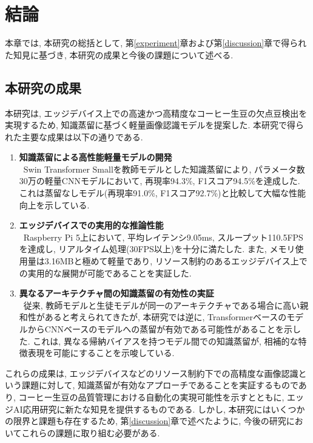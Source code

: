 \chapter{結論}
本章では, 本研究の総括として, 第\ref{experiment}章および第\ref{discussion}章で得られた知見に基づき, 本研究の成果と今後の課題について述べる. 

\section{本研究の成果}
本研究は, エッジデバイス上での高速かつ高精度なコーヒー生豆の欠点豆検出を実現するため, 知識蒸留に基づく軽量画像認識モデルを提案した. 
本研究で得られた主要な成果は以下の通りである. 

\begin{enumerate}
  \item \textbf{知識蒸留による高性能軽量モデルの開発}\\
  ~\indent Swin Transformer Smallを教師モデルとした知識蒸留により, パラメータ数30万の軽量CNNモデルにおいて, 再現率94.3\%, F1スコア94.5\%を達成した. 
  これは蒸留なしモデル(再現率91.0\%, F1スコア92.7\%)と比較して大幅な性能向上を示している. 
  
  \item \textbf{エッジデバイスでの実用的な推論性能}\\
  ~\indent Raspberry Pi 5上において, 平均レイテンシ9.05ms, スループット110.5FPSを達成し, リアルタイム処理(30FPS以上)を十分に満たした. 
  また, メモリ使用量は3.16MBと極めて軽量であり, リソース制約のあるエッジデバイス上での実用的な展開が可能であることを実証した. 
  
  \item \textbf{異なるアーキテクチャ間の知識蒸留の有効性の実証}\\
  ~\indent 従来, 教師モデルと生徒モデルが同一のアーキテクチャである場合に高い親和性があると考えられてきたが, 本研究では逆に, TransformerベースのモデルからCNNベースのモデルへの蒸留が有効である可能性があることを示した. 
  これは, 異なる帰納バイアスを持つモデル間での知識蒸留が, 相補的な特徴表現を可能にすることを示唆している. 
\end{enumerate}

これらの成果は, エッジデバイスなどのリソース制約下での高精度な画像認識という課題に対して, 知識蒸留が有効なアプローチであることを実証するものであり, コーヒー生豆の品質管理における自動化の実現可能性を示すとともに, エッジAI応用研究に新たな知見を提供するものである. 
しかし, 本研究にはいくつかの限界と課題も存在するため, 第\ref{discussion}章で述べたように, 今後の研究においてこれらの課題に取り組む必要がある.

